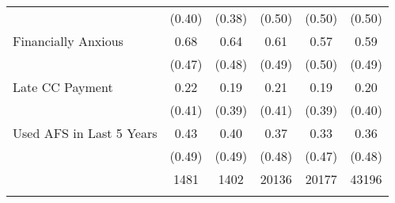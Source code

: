 {\begin{tabular}{l*{5}{c}}
                    &      (0.40)&      (0.38)&      (0.50)&      (0.50)&      (0.50)\\
Financially Anxious&        0.68&        0.64&        0.61&        0.57&        0.59\\
                    &      (0.47)&      (0.48)&      (0.49)&      (0.50)&      (0.49)\\
Late CC Payment    &        0.22&        0.19&        0.21&        0.19&        0.20\\
                    &      (0.41)&      (0.39)&      (0.41)&      (0.39)&      (0.40)\\
Used AFS in Last 5 Years&        0.43&        0.40&        0.37&        0.33&        0.36\\
                    &      (0.49)&      (0.49)&      (0.48)&      (0.47)&      (0.48)\\
                    &        1481&        1402&       20136&       20177&       43196\\
\hline\hline
\multicolumn{6}{l}{\footnotesize }\\
\end{tabular}
}
